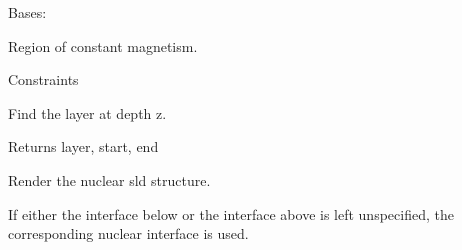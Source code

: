 \documentclass[letterpaper,10pt,english]{sphinxmanual}
\begin{document}
\begin{fulllineitems}
\label{api/magnetic:refl1d.magnetic.MagneticSlab}
Bases: {\hyperref[api/magnetic:refl1d.magnetic.MagneticLayer]{}}

Region of constant magnetism.

\begin{fulllineitems}
\label{api/magnetic:refl1d.magnetic.MagneticSlab.constraints}
Constraints

\end{fulllineitems}


\begin{fulllineitems}
\label{api/magnetic:refl1d.magnetic.MagneticSlab.find}
Find the layer at depth z.

Returns layer, start, end

\end{fulllineitems}


\begin{fulllineitems}
\label{api/magnetic:refl1d.magnetic.MagneticSlab.parameters}
\end{fulllineitems}


\begin{fulllineitems}
\label{api/magnetic:refl1d.magnetic.MagneticSlab.render}
\end{fulllineitems}


\begin{fulllineitems}
\label{api/magnetic:refl1d.magnetic.MagneticSlab.render_stack}
Render the nuclear sld structure.

If either the interface below or the interface above is left
unspecified, the corresponding nuclear interface is used.


\end{fulllineitems}
\end{fulllineitems}
\end{document}
